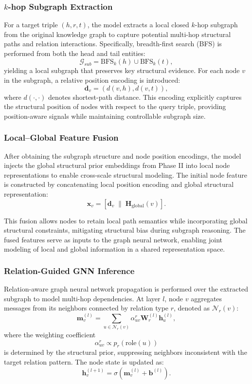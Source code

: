 \documentclass[preprint,12pt]{elsarticle}
\begin{document}
\subsubsection{$k$-hop Subgraph Extraction}

For a target triple $(h,r,t)$, the model extracts a local closed $k$-hop subgraph from the original knowledge graph to capture potential multi-hop structural paths and relation interactions. Specifically, breadth-first search (BFS) is performed from both the head and tail entities:
\[
\mathcal{G}_{sub} = \text{BFS}_k(h) \cup \text{BFS}_k(t),
\]
yielding a local subgraph that preserves key structural evidence. For each node $v$ in the subgraph, a relative position encoding is introduced:
\[
\mathbf{d}_v=(d(v,h),d(v,t)),
\]
where $d(\cdot,\cdot)$ denotes shortest-path distance. This encoding explicitly captures the structural position of nodes with respect to the query triple, providing position-aware signals while maintaining controllable subgraph size.

\subsubsection{Local–Global Feature Fusion}

After obtaining the subgraph structure and node position encodings, the model injects the global structural prior embeddings from Phase II into local node representations to enable cross-scale structural modeling. The initial node feature is constructed by concatenating local position encoding and global structural representation:
\[
\mathbf{x}_v = [\mathbf{d}_v \;\|\; \mathbf{H}_{\text{global}}(v)].
\]

This fusion allows nodes to retain local path semantics while incorporating global structural constraints, mitigating structural bias during subgraph reasoning. The fused features serve as inputs to the graph neural network, enabling joint modeling of local and global information in a shared representation space.

\subsubsection{Relation-Guided GNN Inference}

Relation-aware graph neural network propagation is performed over the extracted subgraph to model multi-hop dependencies. At layer $l$, node $v$ aggregates messages from its neighbors connected by relation type $r$, denoted as $\mathcal{N}_r(v)$:
\[
\mathbf{m}_v^{(l)}=\sum_{u\in\mathcal{N}_r(v)}
\alpha_{uv}^r \mathbf{W}_r^{(l)}\mathbf{h}_u^{(l)},
\]
where the weighting coefficient
\[
\alpha_{uv}^r \propto p_r(\text{role}(u))
\]
is determined by the structural prior, suppressing neighbors inconsistent with the target relation pattern. The node state is updated as:
\[
\mathbf{h}_v^{(l+1)}=\sigma(\mathbf{m}_v^{(l)}+\mathbf{b}^{(l)}).
\]
\end{document}

